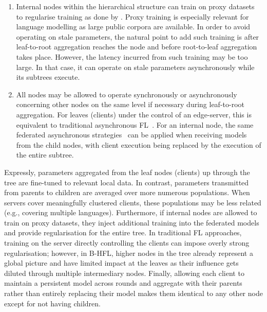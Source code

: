 \begin{enumerate}
    \item Internal nodes within the hierarchical structure can train on proxy datasets to regularise training as done by \citet{OneShotFL,FLwithNonIID}. Proxy training is especially relevant for language modelling as large public corpora are available. In order to avoid operating on stale parameters, the natural point to add such training is after leaf-to-root aggregation reaches the node and before root-to-leaf aggregation takes place. However, the latency incurred from such training may be too large. In that case, it can operate on stale parameters asynchronously while its subtrees execute.
    \item All nodes may be allowed to operate synchronously or asynchronously concerning other nodes on the same level if necessary during leaf-to-root aggregation. For leaves (clients) under the control of an edge-server, this is equivalent to traditional asynchronous FL~\citep{AsynchronousFLonHetDevicesSurvey}. For an internal node, the same federated asynchronous strategies~\citep{FedBuff,PAPAYA} can be applied when receiving models from the child nodes, with client execution being replaced by the execution of the entire subtree.
\end{enumerate}


Expressly, parameters aggregated from the leaf nodes (clients) up through the tree are fine-tuned to relevant local data. In contrast, parameters transmitted from parents to children are averaged over more numerous populations. When servers cover meaningfully clustered clients, these populations may be less related (e.g., covering multiple languages). Furthermore, if internal nodes are allowed to train on proxy datasets, they inject additional training into the federated models and provide regularisation for the entire tree. In traditional FL approaches, training on the server directly controlling the clients can impose overly strong regularisation; however, in B-HFL, higher nodes in the tree already represent a global picture and have limited impact at the leaves as their influence gets diluted through multiple intermediary nodes. Finally, allowing each client to maintain a persistent model across rounds and aggregate with their parents rather than entirely replacing their model makes them identical to any other node except for not having children.

